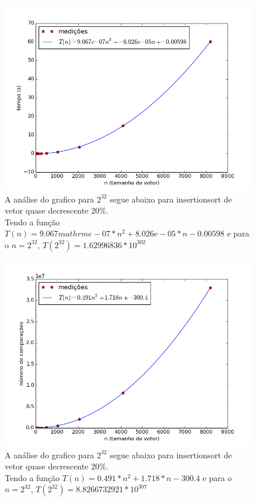 \documentclass[12pt,a4paper,twoside]{report}
\begin{document}


\begin{figure}[ht]
\centering \includegraphics[scale=0.8]{../insertionsort/imagens/insertionsortQuaseDecresc200.png}
\caption{A análise do grafico para $2^{32}$ segue abaixo para insertionsort de vetor quase decrescente 20\%.\\
Tendo a função $T(n) = 9.067mathrm{e}-07*n^2+8.026\mathrm{e}-05*n-0.00598$ e para o $n =2^{32}$, $T(2^{32}) = 1.62996836 * 10^{302}$}
\label{fig:insertionsortQuaseDecresc200}
\end{figure}

\begin{figure}[ht]
\centering \includegraphics[scale=0.8]{../insertionsort/imagens/insertionsortQuaseDecresc201.png}
\caption{A análise do grafico para $2^{32}$ segue abaixo para insertionsort de vetor quase decrescente 20\%.\\
Tendo a função $T(n) = 0.491*n^2+1.718*n-300.4$ e para o $n =2^{32}$, $T(2^{32}) = 8.8266732921 * 10^{307}$}
\label{fig:insertionsortQuaseDecresc201}
\end{figure}
\end{document}

